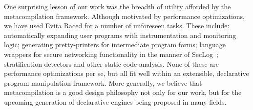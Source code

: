 One surprising lesson of our work was the breadth of utility afforded by the
metacompilation framework.  Although motivated by performance optimizations, we
have used Evita Raced for a number of unforeseen tasks.  These include:
automatically expanding user programs with instrumentation and monitoring
logic; generating pretty-printers for intermediate program forms; language
wrappers for secure networking functionality in the manner of
SecLog~\cite{abadi-netdb07}; stratification detectors and other static code
analysis.  None of these are performance optimizations per se, but all fit well
within an extensible, declarative program manipulation framework.  More
generally, we believe that metacompilation is a good design philosophy not only
for our work, but for the upcoming generation of declarative engines being
proposed in many fields.

